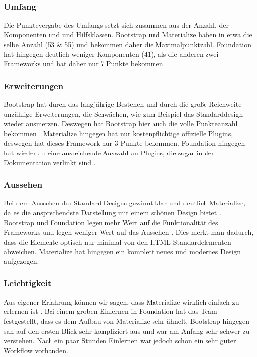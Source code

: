 \label{tbl:comparison}~\\
\subsubsection{Umfang}
Die Punktevergabe des Umfangs setzt sich zusammen aus der Anzahl, der Komponenten und und Hilfsklassen. Bootstrap und Materialize haben in etwa die selbe Anzahl (53 \& 55) und bekommen daher die Maximalpunktzahl\cite{bootstrap-docu,WebDocMaterialize,foundation-docu}. Foundation hat hingegen deutlich weniger Komponenten (41), als die anderen zwei Frameworks und hat daher nur 7 Punkte bekommen.
\subsubsection{Erweiterungen}
Bootstrap hat durch das langjährige Bestehen und durch die große Reichweite unzählige Erweiterungen, die Schwächen, wie zum Beispiel das Standarddesign wieder ausmerzen. Deswegen hat Bootstrap hier auch die volle Punkteanzahl bekommen \cite{introduction-bootstrap}. Materialize hingegen hat nur kostenpflichtige offizielle Plugins, deswegen hat dieses Framework nur 3 Punkte bekommen. Foundation hingegen hat wiederum eine ausreichende Auswahl an Plugins, die sogar in der Dokumentation verlinkt sind \cite{foundation-docu}. 
\subsubsection{Aussehen}
Bei dem Aussehen des Standard-Designs gewinnt klar und deutlich Materialize, da es die ansprechendste Darstellung mit einem schönen Design bietet \cite{WebDocMaterialize}. Bootstrap und Foundation legen mehr Wert auf die Funktionalität des Frameworks und legen weniger Wert auf das Aussehen \cite{bootstrap-docu, foundation-docu}. Dies merkt man dadurch, dass die Elemente optisch nur minimal von den HTML-Standardelementen abweichen. Materialize hat hingegen ein komplett neues und modernes Design aufgezogen.
\subsubsection{Leichtigkeit}
Aus eigener Erfahrung können wir sagen, dass Materialize wirklich einfach zu erlernen ist \cite{WebDocMaterialize}. Bei einem groben Einlernen in Foundation hat das Team festgestellt, dass es dem Aufbau von Materialize sehr ähnelt. Bootstrap hingegen sah auf den ersten Blick sehr kompliziert aus und war am Anfang sehr schwer zu verstehen. Nach ein paar Stunden Einlernen war jedoch schon ein sehr guter Workflow vorhanden.

